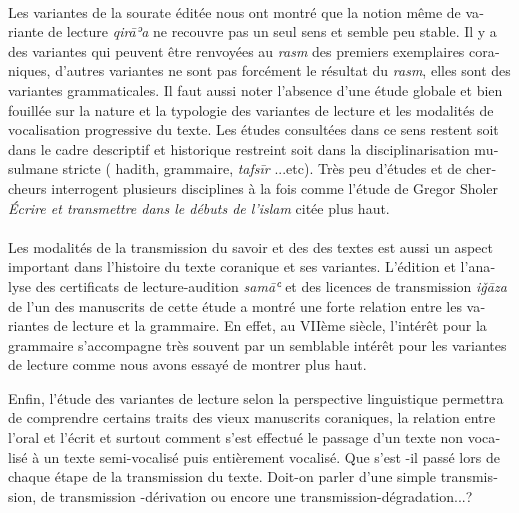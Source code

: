 \documentclass[a4paper,12pt]{report}
\begin{document}
\begin{french}
\paragraph{}
Les variantes de la sourate éditée nous ont  montré que la notion même de variante de lecture \textit{qirāʾa} ne recouvre pas un seul sens et semble peu stable. Il y a des variantes qui peuvent  être renvoyées au \textit{rasm}  des premiers exemplaires coraniques, d'autres variantes ne sont pas forcément le résultat du \textit{rasm}, elles sont  des variantes grammaticales. Il faut aussi noter  l'absence d'une étude globale et bien fouillée sur la nature et la typologie des variantes de lecture et les modalités de vocalisation progressive du texte. Les études consultées dans  ce sens restent soit  dans le cadre descriptif  et historique restreint soit dans la disciplinarisation musulmane stricte ( hadith, grammaire, \textit{tafs\=ir} ...etc). Très peu d'études et de chercheurs  interrogent plusieurs disciplines à la fois comme l'étude de  Gregor Sholer \textit{Écrire et transmettre dans le débuts de l'islam } citée plus haut.                                                                                                                                                                                                                                                                                                                                                                                                                                                                                                                                                                                                                        \paragraph{}  
Les modalités de la transmission du savoir et des des textes  est aussi un  aspect important dans l'histoire du texte coranique et ses variantes. L'édition et l'analyse des certificats de lecture-audition \textit{samāʿ} et des licences de transmission \textit{iǧāza}  de l'un des manuscrits de cette étude  a montré une forte relation entre les  variantes de lecture et la grammaire. En effet,  au VIIème siècle,  l'intérêt pour la grammaire s'accompagne très souvent par un semblable intérêt pour les variantes de lecture comme nous avons  essayé de montrer plus haut.  

Enfin, l'étude des variantes de lecture selon  la perspective linguistique permettra de comprendre certains traits des vieux manuscrits coraniques, la relation entre l'oral et l'écrit et surtout comment s'est effectué  le passage d'un texte non vocalisé à un texte semi-vocalisé puis entièrement vocalisé. Que s'est -il passé  lors de chaque étape de  la transmission du texte.    Doit-on parler d'une simple transmission, de   transmission -dérivation ou   encore une transmission-dégradation...? 









\end{french}
\end{document}
